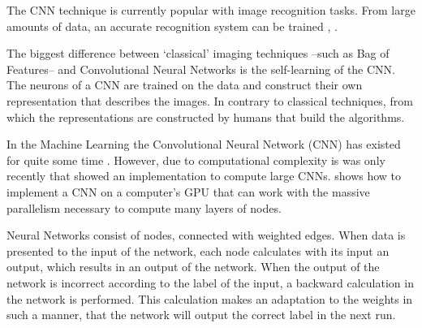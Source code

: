 The CNN technique is currently popular with image recognition tasks.
From large amounts of data, an accurate recognition system can be trained \citep{girshick2014rich}, \citep{razavian2014cnn}.

The biggest difference between `classical' imaging techniques --such as Bag of Features-- and Convolutional Neural Networks is the self-learning of the CNN.
The neurons of a CNN are trained on the data and construct their own representation that describes the images.
In contrary to classical techniques, from which the representations are constructed by humans that build the algorithms.



In the Machine Learning the Convolutional Neural Network (CNN) has existed for quite some time \citep{fukushimaontstaan1980neocognitron}.
However, due to computational complexity is was only recently that \citet{krizhevsky2012imagenet} showed an implementation to compute large CNNs.
\citeauthor{krizhevsky2012imagenet} shows how to implement a CNN on a computer's GPU that can work with the massive parallelism necessary to compute many layers of nodes.

Neural Networks consist of nodes, connected with weighted edges.
When data is presented to the input of the network, each node calculates with its input an output, which results in an output of the network.
When the output of the network is incorrect according to the label of the input, a backward calculation in the network is performed.
This calculation makes an adaptation to the weights in such a manner, that the network will output the correct label in the next run.

